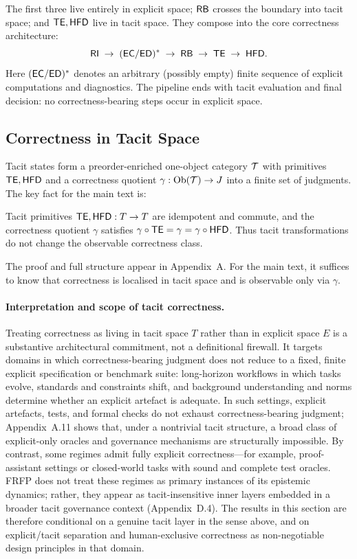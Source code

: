 The first three live entirely in explicit space; \(\mathsf{RB}\) crosses the boundary into tacit space; and \(\mathsf{TE},\mathsf{HFD}\) live in tacit space. They compose into the core correctness architecture:
\[
\mathsf{RI} \;\to\; (\mathsf{EC}/\mathsf{ED})^\ast \;\to\; \mathsf{RB} \;\to\; \mathsf{TE} \;\to\; \mathsf{HFD}.
\]
Here \((\mathsf{EC}/\mathsf{ED})^\ast\) denotes an arbitrary (possibly empty) finite sequence of explicit computations and diagnostics. The pipeline ends with tacit evaluation and final decision: no correctness-bearing steps occur in explicit space.

\subsection{Correctness in Tacit Space}

Tacit states form a preorder-enriched one-object category \(\mathcal{T}\) with primitives \(\mathsf{TE},\mathsf{HFD}\) and a correctness quotient \(\gamma:\mathrm{Ob}(\mathcal{T})\to J\) into a finite set of judgments. The key fact for the main text is:

\begin{proposition}
Tacit primitives \(\mathsf{TE},\mathsf{HFD}:T\to T\) are idempotent and commute, and the correctness quotient \(\gamma\) satisfies \(\gamma\circ\mathsf{TE}=\gamma=\gamma\circ\mathsf{HFD}\). Thus tacit transformations do not change the observable correctness class.
\end{proposition}

The proof and full structure appear in Appendix~A. For the main text, it suffices to know that correctness is localised in tacit space and is observable only via \(\gamma\).

\paragraph{Interpretation and scope of tacit correctness.}
Treating correctness as living in tacit space \(T\) rather than in explicit space \(E\) is a substantive architectural commitment, not a definitional firewall. It targets domains in which correctness-bearing judgment does not reduce to a fixed, finite explicit specification or benchmark suite: long-horizon workflows in which tasks evolve, standards and constraints shift, and background understanding and norms determine whether an explicit artefact is adequate. In such settings, explicit artefacts, tests, and formal checks do not exhaust correctness-bearing judgment; Appendix~A.11 shows that, under a nontrivial tacit structure, a broad class of explicit-only oracles and governance mechanisms are structurally impossible. By contrast, some regimes admit fully explicit correctness---for example, proof-assistant settings or closed-world tasks with sound and complete test oracles. FRFP does not treat these regimes as primary instances of its epistemic dynamics; rather, they appear as tacit-insensitive inner layers embedded in a broader tacit governance context (Appendix~D.4). The results in this section are therefore conditional on a genuine tacit layer in the sense above, and on explicit/tacit separation and human-exclusive correctness as non-negotiable design principles in that domain.

